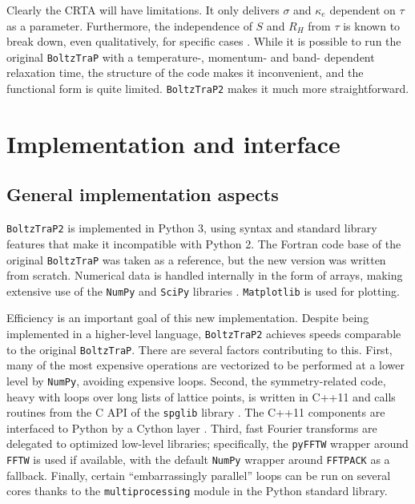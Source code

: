 \documentclass[final,5p,times,twocolumn,sort&compress]{elsarticle}
\begin{document}
Clearly the CRTA will have limitations. It only delivers $\sigma$ and $\kappa_e$ dependent on $\tau$ as a parameter. Furthermore, the independence of $S$ and $R_H$ from $\tau$ is known to break down, even qualitatively, for specific cases \cite{Xu_PRL14}. While it is possible to run the original \texttt{BoltzTraP} with a temperature-, momentum- and band- dependent relaxation time, the structure of the code makes it inconvenient, and the functional form is quite limited. \texttt{BoltzTraP2} makes it much more straightforward.

\section{Implementation and interface}


\subsection{General implementation aspects}

\texttt{BoltzTraP2} is implemented in Python 3, using syntax and standard library features that make it incompatible with Python 2. The Fortran code base of the original \texttt{BoltzTraP} was taken as a reference, but the new version was written from scratch. Numerical data is handled internally in the form of arrays, making extensive use of the  \texttt{NumPy} and  \texttt{SciPy} libraries \cite{numpy,scipy}.  \texttt{Matplotlib} \cite{matplotlib} is used for plotting.

Efficiency is an important goal of this new implementation. Despite being implemented in a higher-level language, \texttt{BoltzTraP2} achieves speeds comparable to the original \texttt{BoltzTraP}. There are several factors contributing to this. First, many of the most expensive operations are vectorized to be performed at a lower level by \texttt{NumPy}, avoiding expensive loops. Second, the symmetry-related code, heavy with loops over long lists of lattice points, is written in C++11 and calls routines from the C API of the \texttt{spglib} library \cite{spglib}. The C++11 components are interfaced to Python by a Cython layer \cite{cython}. Third, fast Fourier transforms are delegated to optimized low-level libraries; specifically, the \texttt{pyFFTW} wrapper around \texttt{FFTW} \cite{fftw} is used if available, with the default \texttt{NumPy} wrapper around \texttt{FFTPACK} \cite{fftpack} as a fallback. Finally, certain ``embarrassingly parallel'' loops can be run on several cores thanks to the \texttt{multiprocessing} module in the Python standard library.
\end{document}
